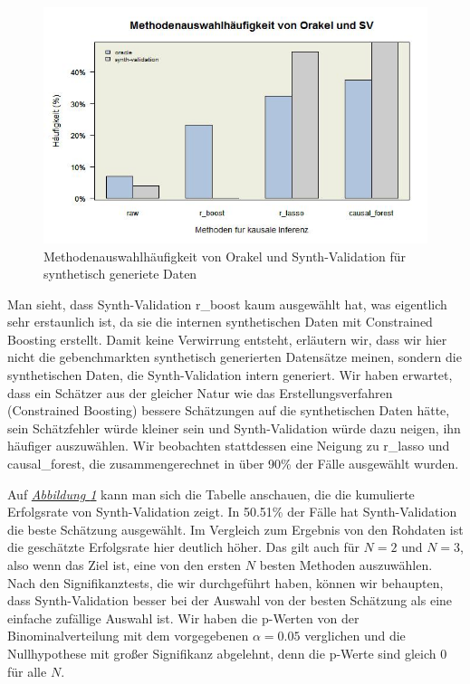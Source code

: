 \documentclass[12pt,a4paper,twoside]{scrartcl}
\numberwithin{equation}{section}
\newcommand{\reffig}[1]{\emph{\hyperref[#1]{Abbildung \ref*{#1}}}}
\begin{document}
\begin{center}
\begin{figure}[h]
    \centering
    \includegraphics[height=0.5\textwidth, width=1\textwidth]{figures/plots/generatedDataBarplot.jpeg}
    \caption[Methodenauswahlhäufigkeit von Orakel und Synth-Validation für synthetisch generiete Daten]{Methodenauswahlhäufigkeit von Orakel und Synth-Validation für synthetisch generiete Daten}\label{fig:generatedDataBarplot}
  \end{figure}
\end{center}

\noindent
Man sieht, dass Synth-Validation r\_boost kaum ausgewählt hat, was eigentlich sehr erstaunlich ist, da sie die internen synthetischen Daten mit Constrained Boosting erstellt. Damit keine Verwirrung entsteht, erläutern wir, dass wir hier nicht die gebenchmarkten synthetisch generierten Datensätze meinen, sondern die synthetischen  Daten, die Synth-Validation intern generiert. Wir haben erwartet, dass ein Schätzer aus der gleicher Natur wie das Erstellungsverfahren (Constrained Boosting) bessere Schätzungen auf die synthetischen Daten hätte, sein Schätzfehler würde kleiner sein und Synth-Validation würde dazu neigen, ihn häufiger auszuwählen. Wir beobachten stattdessen eine Neigung zu r\_lasso und causal\_forest, die zusammengerechnet in über 90\% der Fälle ausgewählt wurden.\par

\noindent
Auf \reffig{fig:generatedDataBarplot} kann man sich die Tabelle anschauen, die die kumulierte Erfolgsrate von Synth-Validation zeigt. In 50.51\% der Fälle hat Synth-Validation die beste Schätzung ausgewählt. Im Vergleich zum Ergebnis von den Rohdaten ist die geschätzte Erfolgsrate hier deutlich höher. Das gilt auch für $N=2$ und $N=3$, also wenn das Ziel ist, eine von den ersten $N$ besten Methoden auszuwählen. Nach den Signifikanztests, die wir durchgeführt haben, können wir behaupten, dass Synth-Validation besser bei der Auswahl von der besten Schätzung als eine einfache zufällige Auswahl ist. Wir haben die p-Werten von der Binominalverteilung mit dem vorgegebenen $\alpha = 0.05$ verglichen und die Nullhypothese mit großer Signifikanz abgelehnt, denn die p-Werte sind gleich 0 für alle $N$.
\end{document}
